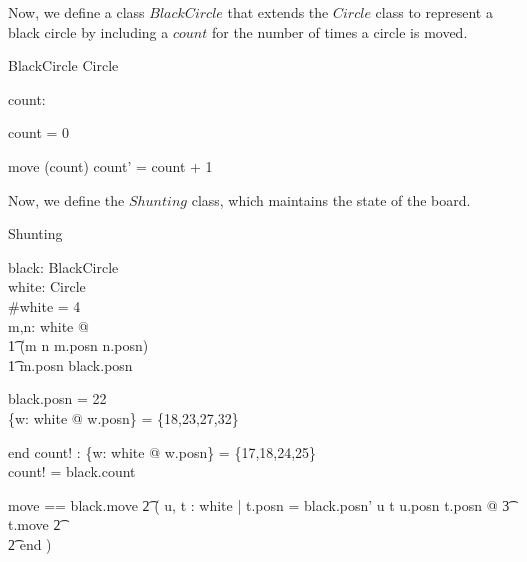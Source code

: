 \documentclass[11pt,a4paper]{article}
\begin{document}
Now, we define a class $BlackCircle$ that extends the $Circle$ class to
represent a black circle by including a $count$ for the number of times a
circle is moved.

\begin{class}{BlackCircle}
\also
\inherits Circle\\

\begin{state}
  count: \nat
\end{state}

\begin{init}
  count = 0
\end{init}

\begin{schema}{move}
  \Delta(count)
\where
  count' = count + 1
\end{schema}
\end{class}

Now, we define the $Shunting$ class, which maintains the state of the
board.

\begin{class}{Shunting}
\also
\begin{state}
  black: BlackCircle \\
  white: \power Circle \\
\where
  \#white = 4 \\
  \forall m,n: white @ \\
      \t1 (m \neq n \iff m.posn \neq n.posn) \land \\
      \t1 m.posn \neq black.posn
\end{state}

\begin{init}
  black.posn = 22 \\
  \{w: white @ w.posn\} = \{18,23,27,32\} \\ 
\end{init}
 
\begin{schema}{end}
  count! : \nat
\where
  \{w: white @ w.posn\} = \{17,18,24,25\} \\
  count! = black.count
\end{schema} 

move == black.move \land
         \t2 ( \dgch u, t : white | t.posn = black.posn' \land
                u \neq t \land u.posn \neq t.posn @
		\t3 t.move
		\t2 \gch \\
		\t2 end )
\end{class}
\end{document}
